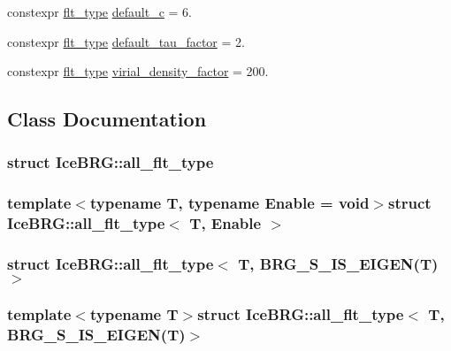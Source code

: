 \begin{DoxyCompactItemize}
\item 
constexpr \hyperlink{lib_2IceBRG__main_2common_8h_ad0f130a56eeb944d9ef2692ee881ecc4}{flt\+\_\+type} \hyperlink{namespaceIceBRG_abcd07f4d78fce67e4c2d0a7929722725}{default\+\_\+c} = 6.
\item 
constexpr \hyperlink{lib_2IceBRG__main_2common_8h_ad0f130a56eeb944d9ef2692ee881ecc4}{flt\+\_\+type} \hyperlink{namespaceIceBRG_a0676bacdb07e422cde03208f56210270}{default\+\_\+tau\+\_\+factor} = 2.
\item 
constexpr \hyperlink{lib_2IceBRG__main_2common_8h_ad0f130a56eeb944d9ef2692ee881ecc4}{flt\+\_\+type} \hyperlink{namespaceIceBRG_aefc8a3f77d90888480c87cde4e641f9e}{virial\+\_\+density\+\_\+factor} = 200.
\end{DoxyCompactItemize}


\subsection{Class Documentation}
\label{structIceBRG_1_1all__flt__type}
\hypertarget{namespaceIceBRG_structIceBRG_1_1all__flt__type}{}
\subsubsection{struct Ice\+B\+R\+G\+:\+:all\+\_\+flt\+\_\+type}
\subsubsection*{template$<$typename T, typename Enable = void$>$struct Ice\+B\+R\+G\+::all\+\_\+flt\+\_\+type$<$ T, Enable $>$}

\label{structIceBRG_1_1all__flt__type_3_01T_00_01BRG__S__IS__EIGEN_07T_08_4}
\hypertarget{namespaceIceBRG_structIceBRG_1_1all__flt__type_3_01T_00_01BRG__S__IS__EIGEN_07T_08_4}{}
\subsubsection{struct Ice\+B\+R\+G\+:\+:all\+\_\+flt\+\_\+type$<$ T, B\+R\+G\+\_\+\+S\+\_\+\+I\+S\+\_\+\+E\+I\+G\+E\+N(T)$>$}
\subsubsection*{template$<$typename T$>$struct Ice\+B\+R\+G\+::all\+\_\+flt\+\_\+type$<$ T, B\+R\+G\+\_\+\+S\+\_\+\+I\+S\+\_\+\+E\+I\+G\+E\+N(\+T)$>$}

